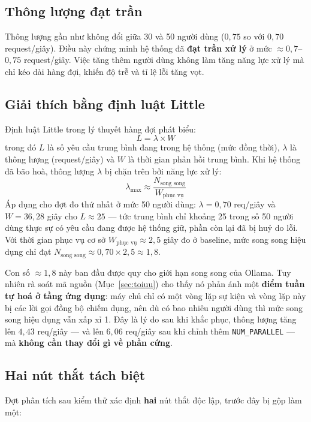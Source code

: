 \documentclass[12pt,a4paper]{article}
\begin{document}
\subsection{Thông lượng đạt trần}

Thông lượng gần như không đổi giữa 30 và 50 người dùng ($0{,}75$ so với $0{,}70$
request/giây). Điều này chứng minh hệ thống đã \textbf{đạt trần xử lý} ở mức
$\approx 0{,}7$--$0{,}75$ request/giây. Việc tăng thêm người dùng không làm tăng
năng lực xử lý mà chỉ kéo dài hàng đợi, khiến độ trễ và tỉ lệ lỗi tăng vọt.

\subsection{Giải thích bằng định luật Little}

Định luật Little trong lý thuyết hàng đợi phát biểu:
\[
 L = \lambda \times W
\]
trong đó $L$ là số yêu cầu trung bình đang trong hệ thống (mức đồng thời),
$\lambda$ là thông lượng (request/giây) và $W$ là thời gian phản hồi trung bình.
Khi hệ thống đã bão hoà, thông lượng $\lambda$ bị chặn trên bởi năng lực xử lý:
\[
 \lambda_{\max} \approx \frac{N_{\text{song song}}}{W_{\text{phục vụ}}}
\]
Áp dụng cho đợt đo thứ nhất ở mức 50 người dùng: $\lambda = 0{,}70$ req/giây và
$W = 36{,}28$ giây cho $L \approx 25$ --- tức trung bình chỉ khoảng 25 trong số 50
người dùng thực sự có yêu cầu đang được hệ thống giữ, phần còn lại đã bị huỷ do
lỗi. Với thời gian phục vụ cơ sở $W_{\text{phục vụ}} \approx 2{,}5$ giây đo ở
baseline, mức song song hiệu dụng chỉ đạt
$N_{\text{song song}} \approx 0{,}70 \times 2{,}5 \approx 1{,}8$.

Con số $\approx 1{,}8$ này ban đầu được quy cho giới hạn song song của Ollama.
Tuy nhiên rà soát mã nguồn (Mục~\ref{sec:toiuu}) cho thấy nó phản ánh một
\textbf{điểm tuần tự hoá ở tầng ứng dụng}: máy chủ chỉ có một vòng lặp sự kiện và
vòng lặp này bị các lời gọi đồng bộ chiếm dụng, nên dù có bao nhiêu người dùng thì
mức song song hiệu dụng vẫn xấp xỉ 1. Đây là lý do sau khi khắc phục, thông lượng
tăng lên $4{,}43$ req/giây --- và lên $6{,}06$ req/giây sau khi chỉnh thêm
\texttt{NUM\_PARALLEL} --- mà \textbf{không cần thay đổi gì về phần cứng}.

\subsection{Hai nút thắt tách biệt}

Đợt phân tích sau kiểm thử xác định \textbf{hai} nút thắt độc lập, trước đây bị gộp
làm một:
\end{document}
